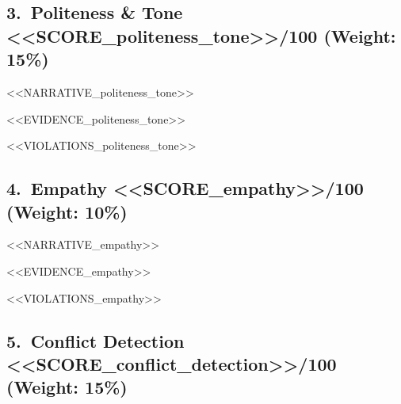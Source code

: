 \documentclass[12pt,a4paper]{article}
\begin{document}
\subsection{3.\ Politeness \& Tone \hfill
  \textcolor{<<COLOR_politeness_tone>>}{<<SCORE_politeness_tone>>/100}
  \normalfont\small\quad(Weight: 15\%)}

<<NARRATIVE_politeness_tone>>

\begin{tcolorbox}[evidencebox]
\begin{itemize}[leftmargin=1.2em, itemsep=2pt, topsep=0pt]
<<EVIDENCE_politeness_tone>>
\end{itemize}
\end{tcolorbox}

\begin{tcolorbox}[violationbox]
\begin{itemize}[leftmargin=1.2em, itemsep=2pt, topsep=0pt]
<<VIOLATIONS_politeness_tone>>
\end{itemize}
\end{tcolorbox}

\subsection{4.\ Empathy \hfill
  \textcolor{<<COLOR_empathy>>}{<<SCORE_empathy>>/100}
  \normalfont\small\quad(Weight: 10\%)}

<<NARRATIVE_empathy>>

\begin{tcolorbox}[evidencebox]
\begin{itemize}[leftmargin=1.2em, itemsep=2pt, topsep=0pt]
<<EVIDENCE_empathy>>
\end{itemize}
\end{tcolorbox}

\begin{tcolorbox}[violationbox]
\begin{itemize}[leftmargin=1.2em, itemsep=2pt, topsep=0pt]
<<VIOLATIONS_empathy>>
\end{itemize}
\end{tcolorbox}

\subsection{5.\ Conflict Detection \hfill
  \textcolor{<<COLOR_conflict_detection>>}{<<SCORE_conflict_detection>>/100}
  \normalfont\small\quad(Weight: 15\%)}
\end{document}
